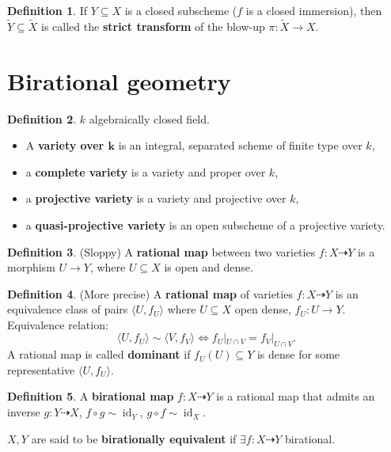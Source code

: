 \documentclass[12pt]{article}
\DeclareMathOperator{\id}{id}
\theoremstyle{definition}
\newtheorem*{definition}{Definition}
\begin{document}
\begin{definition}
If $Y\subseteq X$ is a closed subscheme ($f$ is a closed immersion), then $\widetilde{Y}\subseteq\widetilde{X}$ is called the \textbf{strict transform} of the blow-up $\pi:\widetilde{X}\rightarrow X$.
\end{definition}

\section{Birational geometry}
\begin{definition}
$k$ algebraically closed field.
\begin{itemize}
\item A \textbf{variety over $\boldsymbol{k}$} is an integral, separated scheme of finite type over $k$,
\item a \textbf{complete variety} is a variety and proper over $k$,
\item a \textbf{projective variety} is a variety and projective over $k$,
\item a \textbf{quasi-projective variety} is an open subscheme of a projective variety.
\end{itemize}
\end{definition}

\begin{definition}
(Sloppy) A \textbf{rational map} between two varieties $f:X\dashrightarrow Y$ is a morphism $U\rightarrow Y$, where $U\subseteq X$ is open and dense.
\end{definition}

\begin{definition}
(More precise) A \textbf{rational map} of varieties $f:X\dashrightarrow Y$ is an equivalence class of pairs $\langle U,f_U\rangle$ where $U\subseteq X$ open dense, $f_U:U\rightarrow Y$. Equivalence relation:
\[\langle U,f_U\rangle\sim\langle V,f_V\rangle\Longleftrightarrow f_U|_{U\cap V}=f_V|_{U\cap V}.\]
A rational map is called \textbf{dominant} if $f_U(U)\subseteq Y$ is dense for some representative $\langle U,f_U\rangle$.
\end{definition}

\begin{definition}
A \textbf{birational map} $f:X\dashrightarrow Y$ is a rational map that admits an inverse $g:Y\dashrightarrow X$, $f\circ g\sim\id_Y$, $g\circ f\sim\id_X$.

$X,Y$ are said to be \textbf{birationally equivalent} if $\exists f:X\dashrightarrow Y$ birational.
\end{definition}
\end{document}
